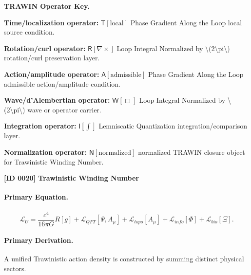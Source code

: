 \par\vspace{0.45\baselineskip}
\noindent\begin{minipage}[t]{\linewidth}
\begingroup
\small
\raggedright
\textbf{TRAWIN Operator Key.}\par
\noindent\textbf{Time/localization operator:} $\mathsf{T}\!\left[\mathrm{local}\right]$ Phase Gradient Along the Loop local source condition.\par
\noindent\textbf{Rotation/curl operator:} $\mathsf{R}\!\left[\nabla\times\right]$ Loop Integral Normalized by \textbackslash{}(2\textbackslash{}pi\textbackslash{}) rotation/curl preservation layer.\par
\noindent\textbf{Action/amplitude operator:} $\mathsf{A}\!\left[\mathrm{admissible}\right]$ Phase Gradient Along the Loop admissible action/amplitude condition.\par
\noindent\textbf{Wave/d'Alembertian operator:} $\mathsf{W}\!\left[\Box\right]$ Loop Integral Normalized by \textbackslash{}(2\textbackslash{}pi\textbackslash{}) wave or operator carrier.\par
\noindent\textbf{Integration operator:} $\mathsf{I}\!\left[\int\right]$ Lemniscatic Quantization integration/comparison layer.\par
\noindent\textbf{Normalization operator:} $\mathsf{N}\!\left[\mathrm{normalized}\right]$ normalized TRAWIN closure object for Trawinistic Winding Number.\par
\endgroup
\end{minipage}

\clearpage
\noindent\textbf{[ID 0020] Trawinistic Winding Number}\par
\vspace{0.35em}
\paragraph{Primary Equation.}
\begin{equation}
\mathcal{L}_U
=
\frac{c^4}{16\pi G}R[g]
+
\mathcal{L}_{QFT}[\Psi,A_\mu]
+
\mathcal{L}_{topo}[A_\mu]
+
\mathcal{L}_{info}[\Phi]
+
\mathcal{L}_{bio}[\Xi].
\end{equation}

\paragraph{Primary Derivation.}
A unified Trawinistic action density is constructed by summing distinct physical sectors.

